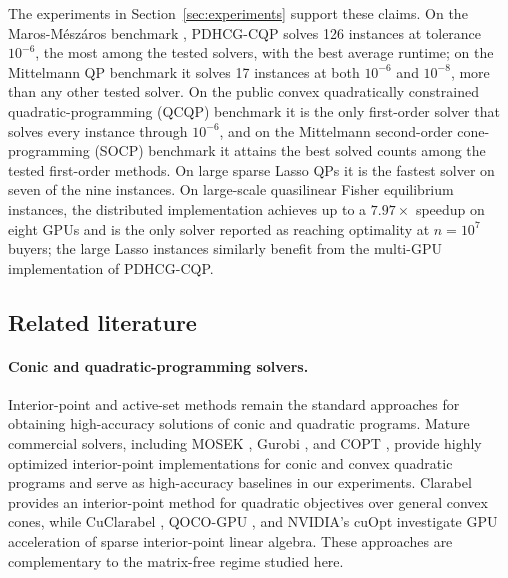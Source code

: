 \documentclass[letterpaper]{article} %
\newcommand{\name}{PDHCG-CQP\xspace}
\theoremstyle{definition}
\theoremstyle{remark}
\begin{document}
The experiments in Section~\ref{sec:experiments} support these claims.  On
the Maros-M{\'e}sz{\'a}ros benchmark
\cite{maros1999repository}, \name solves 126 instances at tolerance
$10^{-6}$, the most among the tested solvers, with the best average
runtime; on the Mittelmann QP benchmark
\cite{mittelmann2021decision} it solves 17 instances at both $10^{-6}$ and
$10^{-8}$, more than any other tested solver.  On the public convex quadratically constrained
quadratic-programming (QCQP) benchmark it is the only first-order solver that solves every instance
through $10^{-6}$, and on the Mittelmann second-order cone-programming (SOCP) benchmark
\cite{mittelmann2024socp} it attains the best solved counts among the
tested first-order methods.  On large sparse Lasso QPs it is the fastest
solver on seven of the nine instances. On large-scale quasilinear Fisher
equilibrium instances, the distributed implementation achieves up to a
$7.97\times$ speedup on eight GPUs and is the only solver reported as reaching
optimality at $n=10^7$ buyers; the large Lasso instances similarly benefit
from the multi-GPU implementation of \name.


\subsection{Related literature}

\paragraph{Conic and quadratic-programming solvers.}
Interior-point and active-set methods remain the standard approaches for
obtaining high-accuracy solutions of conic and quadratic programs.  Mature
commercial solvers, including MOSEK \cite{mosek2025manual}, Gurobi
\cite{gurobi2024manual}, and COPT \cite{ge2022cardinal}, provide highly
optimized interior-point implementations for conic and convex quadratic
programs and serve as high-accuracy baselines in our experiments.
Clarabel \cite{goulart2024clarabel} provides an interior-point method for
quadratic objectives over general convex cones, while CuClarabel
\cite{chen2024cuclarabel}, QOCO-GPU \cite{chari2026qocogpu}, and NVIDIA's cuOpt \cite{nvidia2025cuopt} investigate
GPU acceleration of sparse interior-point linear algebra.  These approaches
are complementary to the matrix-free regime studied here.
\end{document}
